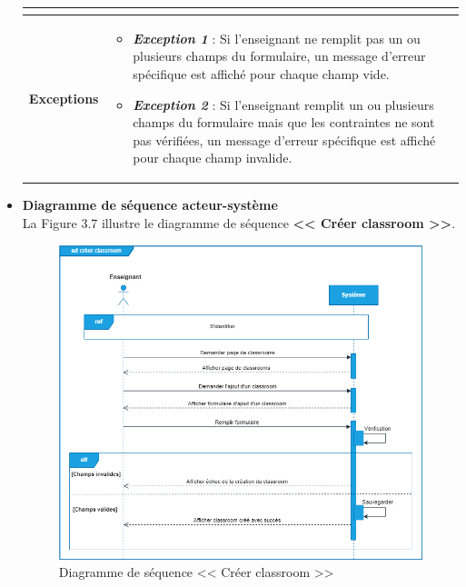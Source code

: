 \begin{itemize}[itemsep=1pt, parsep=1pt]
\begin{longtable}{|>{\RaggedRight\arraybackslash}p{4cm}|>{\RaggedRight\arraybackslash}p{12cm}|}
\begin{itemize}[label=]
        \end{itemize} \\
        \hline
        \textbf{Exceptions} & 
        \begin{itemize}[label=--]
            \item \textbf{\textit{Exception 1}} : Si l’enseignant ne remplit pas un ou plusieurs champs du formulaire, un message d’erreur spécifique est affiché pour chaque champ vide. 
            \item \textbf{\textit{Exception 2}} : Si l’enseignant remplit un ou plusieurs champs du formulaire mais que les contraintes ne sont pas vérifiées, un message d’erreur spécifique est affiché pour chaque champ invalide.
        \end{itemize} \\
        \hline
    \end{longtable}
    
    \item \textbf{Diagramme de séquence acteur-système}\\
    La Figure 3.7 illustre le diagramme de séquence \textbf{<< Créer classroom >>}.
     \begin{figure}[H]
        \centering
        \includegraphics[width=1.1\textwidth,height=0.85\textheight]{images/chp3/fig7.png}
        \caption{Diagramme de séquence << Créer classroom >>}        
        \label{fig:Diagramme de séquence << Créer classroom >>}    
    \end{figure}

\end{itemize}

